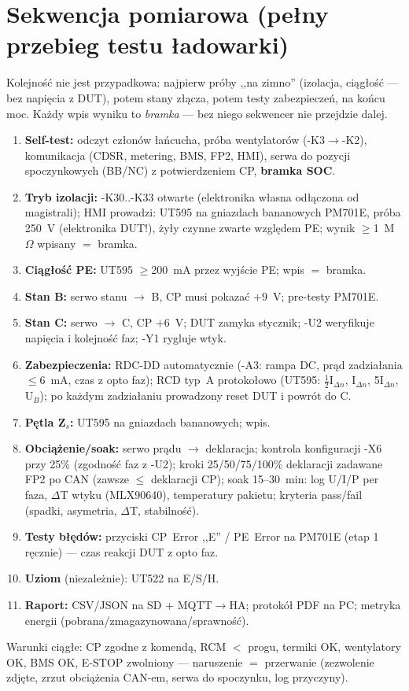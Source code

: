 \documentclass[11pt,a4paper]{article}
\newcommand{\ohm}{$\Omega$}
\begin{document}
\section{Sekwencja pomiarowa (pełny przebieg testu ładowarki)}
Kolejność nie jest przypadkowa: najpierw próby ,,na zimno'' (izolacja, ciągłość --- bez napięcia
z DUT), potem stany złącza, potem testy zabezpieczeń, na końcu moc. Każdy wpis wyniku to
\emph{bramka} --- bez niego sekwencer nie przejdzie dalej.
\begin{enumerate}
\item \textbf{Self-test:} odczyt członów łańcucha, próba wentylatorów (-K3$\to$-K2), komunikacja
(CDSR, metering, BMS, FP2, HMI), serwa do pozycji spoczynkowych (BB/NC) z potwierdzeniem CP,
\textbf{bramka SOC}.
\item \textbf{Tryb izolacji:} -K30..-K33 otwarte (elektronika własna odłączona od magistrali);
HMI prowadzi: UT595 na gniazdach bananowych PM701E, próba 250~V (elektronika DUT!), żyły czynne
zwarte względem PE; wynik $\ge$1~M\ohm{} wpisany $=$ bramka.
\item \textbf{Ciągłość PE:} UT595 $\ge$200~mA przez wyjście PE; wpis $=$ bramka.
\item \textbf{Stan B:} serwo stanu $\to$ B, CP musi pokazać $+9$~V; pre-testy PM701E.
\item \textbf{Stan C:} serwo $\to$ C, CP $+6$~V; DUT zamyka stycznik; -U2 weryfikuje napięcia
i kolejność faz; -Y1 rygluje wtyk.
\item \textbf{Zabezpieczenia:} RDC-DD automatycznie (-A3: rampa DC, prąd zadziałania $\le$6~mA,
czas z opto faz); RCD typ~A protokołowo (UT595: $\frac{1}{2}$I$_{\Delta n}$, I$_{\Delta n}$,
5I$_{\Delta n}$, U$_B$); po każdym zadziałaniu prowadzony reset DUT i powrót do C.
\item \textbf{Pętla Z$_s$:} UT595 na gniazdach bananowych; wpis.
\item \textbf{Obciążenie/soak:} serwo prądu $\to$ deklaracja; kontrola konfiguracji -X6 przy 25\%
(zgodność faz z -U2); kroki 25/50/75/100\% deklaracji zadawane FP2 po CAN (zawsze $\le$ deklaracji
CP); soak 15--30~min: log U/I/P per faza, $\Delta$T wtyku (MLX90640), temperatury pakietu;
kryteria pass/fail (spadki, asymetria, $\Delta$T, stabilność).
\item \textbf{Testy błędów:} przyciski CP~Error ,,E'' / PE~Error na PM701E (etap 1 ręcznie) ---
czas reakcji DUT z opto faz.
\item \textbf{Uziom} (niezależnie): UT522 na E/S/H.
\item \textbf{Raport:} CSV/JSON na SD + MQTT$\to$HA; protokół PDF na PC; metryka energii
(pobrana/zmagazynowana/sprawność).
\end{enumerate}
Warunki ciągłe: CP zgodne z komendą, RCM $<$ progu, termiki OK, wentylatory OK, BMS OK, E-STOP
zwolniony --- naruszenie $=$ przerwanie (zezwolenie zdjęte, zrzut obciążenia CAN-em, serwa do
spoczynku, log przyczyny).
\end{document}
